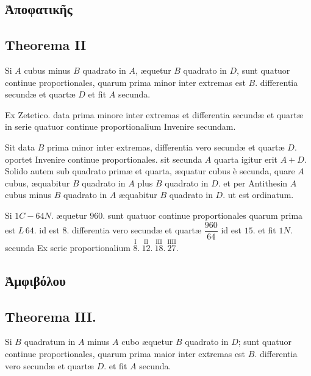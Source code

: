 \documentclass[11pt,a4paper]{article}
\begin{document}
\subsection*{Ἀποφατικῆς}

\subsection*{Theorema II}

Si $A$ cubus minus $B$ quadrato in $A$, æquetur $B$ quadrato in $D$, sunt quatuor continue proportionales, quarum prima minor inter extremas est $B$. differentia secundæ et quartæ $D$ et fit $A$ secunda.

Ex Zetetico. data prima minore inter extremas et differentia secundæ et quartæ in serie quatuor continue proportionalium Invenire secundam.

Sit data $B$ prima minor inter extremas, differentia vero secundæ et quartæ $D$. oportet Invenire continue proportionales. sit secunda $A$ quarta igitur erit $A + D$. Solido autem sub quadrato primæ et quarta, æquatur cubus è secunda, quare $A$ cubus, æquabitur $B$ quadrato in $A$ plus $B$ quadrato in $D$. et per Antithesin $A$ cubus minus $B$ quadrato in $A$ æquabitur $B$ quadrato in $D$. ut est ordinatum.

Si $1C - 64N.$ æquetur $960$. sunt quatuor continue proportionales quarum prima est  $L\,64$. id est $8$. differentia vero secundæ et quartæ $\dfrac{960}{64}$ id est $15$. et fit $1N.$ secunda Ex serie proportionalium $\overset{\mathrm{I}}{8}.\ \overset{\mathrm{II}}{12}.\ \overset{\mathrm{III}}{18}.\ \overset{\mathrm{IIII}}{27}.$

\subsection*{Ἀμφιβόλου}

\subsection*{Theorema III.}

Si $B$ quadratum in $A$ minus $A$ cubo æquetur $B$ quadrato in $D$; sunt quatuor continue proportionales, quarum prima maior inter extremas est $B$. differentia vero secundæ et quartæ $D$. et fit $A$ secunda.
\end{document}
